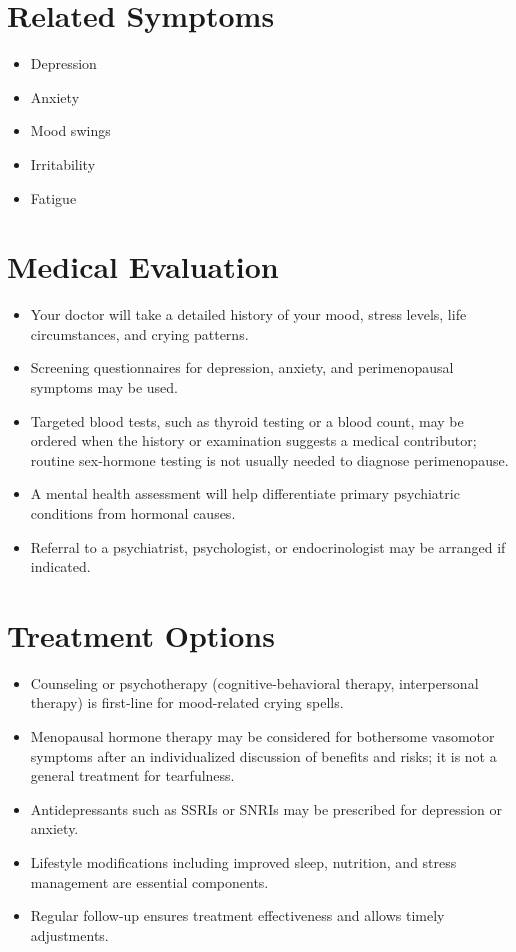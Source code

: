\section*{Related Symptoms}
\begin{itemize}
  \item Depression
  \item Anxiety
  \item Mood swings
  \item Irritability
  \item Fatigue
\end{itemize}


\section*{Medical Evaluation}
\begin{itemize}
  \item Your doctor will take a detailed history of your mood, stress levels, life circumstances, and crying patterns.
  \item Screening questionnaires for depression, anxiety, and perimenopausal symptoms may be used.
   \item Targeted blood tests, such as thyroid testing or a blood count, may be ordered when the history or examination suggests a medical contributor; routine sex-hormone testing is not usually needed to diagnose perimenopause.
  \item A mental health assessment will help differentiate primary psychiatric conditions from hormonal causes.
  \item Referral to a psychiatrist, psychologist, or endocrinologist may be arranged if indicated.
\end{itemize}

\section*{Treatment Options}
\begin{itemize}
  \item Counseling or psychotherapy (cognitive-behavioral therapy, interpersonal therapy) is first-line for mood-related crying spells.
   \item Menopausal hormone therapy may be considered for bothersome vasomotor symptoms after an individualized discussion of benefits and risks; it is not a general treatment for tearfulness.
  \item Antidepressants such as SSRIs or SNRIs may be prescribed for depression or anxiety.
  \item Lifestyle modifications including improved sleep, nutrition, and stress management are essential components.
  \item Regular follow-up ensures treatment effectiveness and allows timely adjustments.
\end{itemize}

